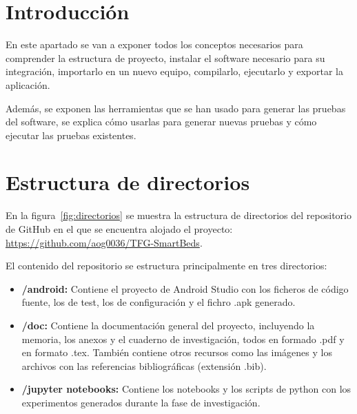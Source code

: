 
\section{Introducción}

En este apartado se van a exponer todos los conceptos necesarios para comprender la estructura de proyecto, instalar el software necesario para su integración, importarlo en un nuevo equipo, compilarlo, ejecutarlo y exportar la aplicación. 

Además, se exponen las herramientas que se han usado para generar las pruebas del software, se explica cómo usarlas para generar nuevas pruebas y cómo ejecutar las pruebas existentes. 

\section{Estructura de directorios}

En la figura~\ref{fig:directorios} se muestra la estructura de directorios del repositorio de GitHub en el que se encuentra alojado el proyecto: \url{https://github.com/aog0036/TFG-SmartBeds}. 

El contenido del repositorio se estructura principalmente en tres directorios: 
\begin{itemize}
	\item \textbf{/android:} Contiene el proyecto de Android Studio con los ficheros de código fuente, los de test, los de configuración y el fichro .apk generado. 
	\item \textbf{/doc:} Contiene la documentación general del proyecto, incluyendo la memoria, los anexos y el cuaderno de investigación, todos en formado .pdf y en formato .tex. También contiene otros recursos como las imágenes y los archivos con las referencias bibliográficas (extensión .bib). 
	\item \textbf{/jupyter notebooks:} Contiene los notebooks y los scripts de python con los experimentos generados durante la fase de investigación. 
\end{itemize}

